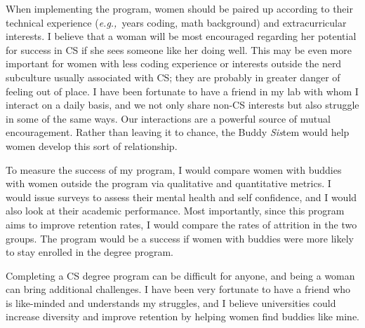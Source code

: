 \documentclass{article}
\newcommand{\eg}{{\em e.g.,}~}
\begin{document}
When implementing the program, women should be paired up according to their technical experience (\eg years coding, math background) and extracurricular interests.
I believe that a woman will be most encouraged regarding her potential for success in CS if she sees someone like her doing well.
This may be even more important for women with less coding experience or interests outside the nerd subculture usually associated with CS; they are probably in greater danger of feeling out of place.
I have been fortunate to have a friend in my lab with whom I interact on a daily basis, and we not only share non-CS interests but also struggle in some of the same ways.
Our interactions are a powerful source of mutual encouragement.
Rather than leaving it to chance, the Buddy \textit{Sis}tem would help women develop this sort of relationship.

To measure the success of my program, I would compare women with buddies with women outside the program via qualitative and quantitative metrics.
I would issue surveys to assess their mental health and self confidence, and I would also look at their academic performance.
Most importantly, since this program aims to improve retention rates, I would compare the rates of attrition in the two groups.
The program would be a success if women with buddies were more likely to stay enrolled in the degree program.

Completing a CS degree program can be difficult for anyone, and being a woman can bring additional challenges.
I have been very fortunate to have a friend who is like-minded and understands my struggles, and I believe universities could increase diversity and improve retention by helping women find buddies like mine.
\end{document}
